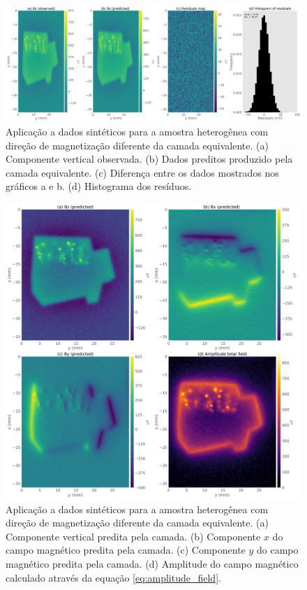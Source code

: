 \begin{figure}
	\centering
	\includegraphics[width=.9\textwidth]{Fig/mag_vec/simulacao_real_errado/results_data_fitting_Bz.png}
	\caption{Aplicação a dados sintéticos para a amostra heterogênea com direção de magnetização diferente da camada equivalente. (a) Componente vertical observada. (b) Dados preditos produzido pela camada equivalente. (c) Diferença entre os dados mostrados nos gráficos a e b. (d) Histograma dos resíduos.}
	\label{fig:datafit_hetero_sample_difdir}
\end{figure}

\begin{figure}
	\centering
	\includegraphics[width=1.\textwidth]{Fig/mag_vec/simulacao_real_errado/field_components_eqlayer.png}
	\caption{Aplicação a dados sintéticos para a amostra heterogênea com direção de magnetização diferente da camada equivalente. (a) Componente vertical predita pela camada. (b) Componente $x$ do campo magnético predita pela camada. (c) Componente $y$ do campo magnético predita pela camada. (d) Amplitude do campo magnético calculado através da equação \ref{eq:amplitude_field}.}
	\label{fig:components_hetero_sample_difdir}
\end{figure}

